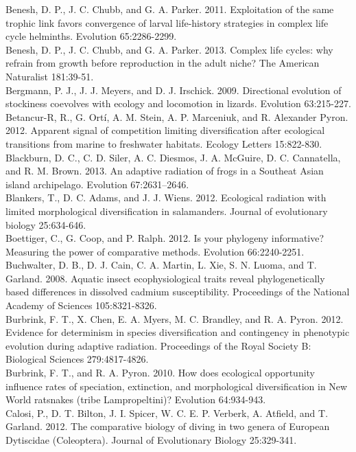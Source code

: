 \documentclass[a4paper,12pt]{article}
\begin{document}
Benesh, D. P., J. C. Chubb, and G. A. Parker. 2011. Exploitation of the same trophic link favors convergence of larval life-history strategies in complex life cycle helminths. Evolution 65:2286-2299.\\
Benesh, D. P., J. C. Chubb, and G. A. Parker. 2013. Complex life cycles: why refrain from growth before reproduction in the adult niche? The American Naturalist 181:39-51.\\
Bergmann, P. J., J. J. Meyers, and D. J. Irschick. 2009. Directional evolution of stockiness coevolves with ecology and locomotion in lizards. Evolution 63:215-227.\\
Betancur-R, R., G. Ortí, A. M. Stein, A. P. Marceniuk, and R. Alexander Pyron. 2012. Apparent signal of competition limiting diversification after ecological transitions from marine to freshwater habitats. Ecology Letters 15:822-830.\\
Blackburn, D. C., C. D. Siler, A. C. Diesmos, J. A. McGuire, D. C. Cannatella, and R. M. Brown. 2013. An adaptive radiation of frogs in a Southeat Asian island archipelago. Evolution 67:2631–2646.\\
Blankers, T., D. C. Adams, and J. J. Wiens. 2012. Ecological radiation with limited morphological diversification in salamanders. Journal of evolutionary biology 25:634-646.\\
Boettiger, C., G. Coop, and P. Ralph. 2012. Is your phylogeny informative? Measuring the power of comparative methods. Evolution 66:2240-2251.\\
Buchwalter, D. B., D. J. Cain, C. A. Martin, L. Xie, S. N. Luoma, and T. Garland. 2008. Aquatic insect ecophysiological traits reveal phylogenetically based differences in dissolved cadmium susceptibility. Proceedings of the National Academy of Sciences 105:8321-8326.\\
Burbrink, F. T., X. Chen, E. A. Myers, M. C. Brandley, and R. A. Pyron. 2012. Evidence for determinism in species diversification and contingency in phenotypic evolution during adaptive radiation. Proceedings of the Royal Society B: Biological Sciences 279:4817-4826.\\
Burbrink, F. T., and R. A. Pyron. 2010. How does ecological opportunity influence rates of speciation, extinction, and morphological diversification in New World ratsnakes (tribe Lampropeltini)? Evolution 64:934-943.\\
Calosi, P., D. T. Bilton, J. I. Spicer, W. C. E. P. Verberk, A. Atfield, and T. Garland. 2012. The comparative biology of diving in two genera of European Dytiscidae (Coleoptera). Journal of Evolutionary Biology 25:329-341.\\
\end{document}
